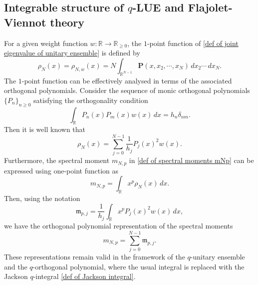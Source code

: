 \documentclass{amsart}
\def\R{\mathbb{R}}
\theoremstyle{plain}
\theoremstyle{remark}
\numberwithin{equation}{section}
\begin{document}
  




\subsection{Integrable structure of $q$-LUE and Flajolet-Viennot theory} \label{Subsection_FV theory}



For a given weight function $w : \R \to \R_{\ge 0}$, the $1$-point function of \eqref{def of joint eigenvalue of unitary ensemble} is defined by
\begin{equation}
    \rho_{N}(x)=\rho_{N,w}(x)=N\int_{\mathbb{R}^{N-1}}\mathbf{P}(x,x_2,\cdots,x_N)\,dx_2\cdots\,dx_{N}.
\end{equation}
The $1$-point function can be effectively analysed in terms of the associated orthogonal polynomials. Consider the sequence of monic orthogonal polynomials $\{P_{n}\}_{n\geq0}$ satisfying the orthogonality condition
\begin{equation}
    \int_{\mathbb{R}}P_n (x) P_m (x)w(x)\,dx =h_{n}\delta_{nm}.
\end{equation}
Then it is well known that 
\begin{equation}\label{def of 1point function with orthogonal polynomial}
    \rho_{N}(x)=\sum_{j=0}^{N-1}\frac{1}{h_{j}}P_{j}(x)^{2}w(x). %
\end{equation} 
Furthermore, the spectral moment $m_{N,p}$ in \eqref{def of spectral moments mNp} can be expressed using one-point function as 
\begin{equation}\label{eqn:spectral moment and 1point function}
    m_{N,p}=\int_{\mathbb{R}}x^{p}\rho_{N}(x)\,dx.
\end{equation}
Then, using the notation
\begin{equation}\label{def of mathfrak m}
    \mathfrak{m}_{p,j}= \frac{1}{h_{j}}\int_{\mathbb{R}}x^{p} P_{j}(x)^{2}w(x)\,dx,
\end{equation}
we have the orthogonal polynomial representation of the spectral moments
\begin{equation}\label{eqn: relation between m and mathfrak m}
    m_{N,p}= \sum_{j=0}^{N-1}\mathfrak{m}_{p,j}.
\end{equation}
These representations remain valid in the framework of the $q$-unitary ensemble and the $q$-orthogonal polynomial, where the usual integral is replaced with the Jackson $q$-integral \eqref{def of Jackson integral}.  
\end{document}
